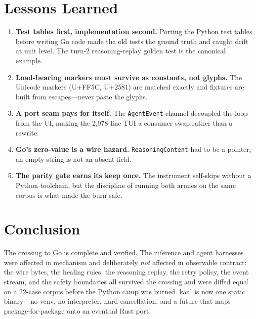 \documentclass[11pt,a4paper]{article}
\begin{document}
\section{Lessons Learned}

\begin{enumerate}[leftmargin=*,itemsep=0.4em]
  \item \textbf{Test tables first, implementation second.} Porting the Python test tables before writing Go code made the old tests the ground truth and caught drift at unit level. The turn-2 reasoning-replay golden test is the canonical example.
  \item \textbf{Load-bearing markers must survive as constants, not glyphs.} The Unicode markers (U+FF5C, U+2581) are matched exactly and fixtures are built from escapes---never paste the glyphs.
  \item \textbf{A port seam pays for itself.} The \texttt{AgentEvent} channel decoupled the loop from the UI, making the 2,978-line TUI a consumer swap rather than a rewrite.
  \item \textbf{Go's zero-value is a wire hazard.} \texttt{ReasoningContent} had to be a pointer; an empty string is not an absent field.
  \item \textbf{The parity gate earns its keep once.} The instrument self-skips without a Python toolchain, but the discipline of running both armies on the same corpus is what made the burn safe.
\end{enumerate}

\section{Conclusion}

\noindent
The crossing to Go is complete and verified. The inference and agent harnesses were affected in mechanism and deliberately \emph{not} affected in observable contract: the wire bytes, the healing rules, the reasoning replay, the retry policy, the event stream, and the safety boundaries all survived the crossing and were diffed equal on a 22-case corpus before the Python camp was burned. kaal is now one static binary---no venv, no interpreter, hard cancellation, and a future that maps package-for-package onto an eventual Rust port.
\end{document}
